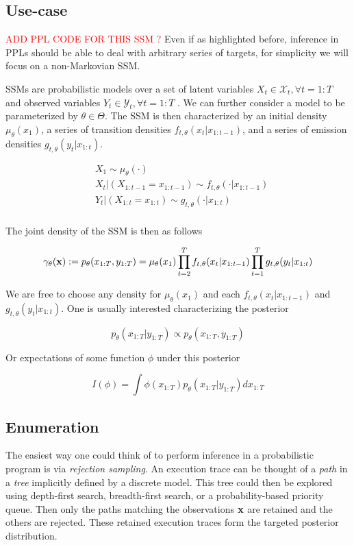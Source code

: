 \subsection{Use-case}
\textcolor{red}{ADD PPL CODE FOR THIS SSM ?}
Even if as highlighted before, inference in \gls{PPL}s should be able to deal with arbitrary series of targets, for simplicity we will focus on a non-Markovian \gls{SSM}.

\Gls{SSM}s are probabilistic models over a set of latent variables $X_t \in \mathcal{X}_t, \forall t = 1 : T$ and observed variables $Y_t \in \mathcal{Y}_t , \forall t = 1 : T$ . We can further consider a model to be parameterized by $\theta \in \Theta$. The \gls{SSM} is then characterized by an initial density $\mu_\theta(x_1)$, a series of transition densities $f_{t,\theta}(x_t|x_{1:t-1})$, and a series of emission densities $g_{t,\theta}(y_t|x_{1:t})$.

\begin{equation*}
\begin{aligned}
& X_1 \sim \mu_\theta(\cdot) \\
& X_t|(X_{1:t-1} = x_{1:t-1}) \sim f_{t,\theta}(\cdot|x_{1:t-1}) \\
& Y_t|(X_{1:t} = x_{1:t}) \sim g_{t,\theta}(\cdot|x_{1:t}) \\
\end{aligned}
\end{equation*}

The joint density of the \gls{SSM} is then as follows

$$ \gamma_\theta(\boldsymbol{\mathbf{x}}) := p_\theta(x_{1:T},y_{1:T}) = \mu_\theta(x_1) \prod_{t=2}^T f_{t,\theta}(x_t|x_{1:t-1}) \prod_{t=1}^T g_{t,\theta}(y_t|x_{1:t}) $$

We are free to choose any density for $\mu_\theta(x_1)$ and each $f_{t,\theta}(x_t|x_{1:t-1})$ and $g_{t,\theta}(y_t|x_{1:t})$. One is usually interested characterizing the posterior

$$ p_\theta(x_{1:T}|y_{1:T}) \propto p_\theta(x_{1:T},y_{1:T}) $$

Or expectations of some function $\phi$ under this posterior

$$ I(\phi) = \int \phi(x_{1:T}) p_\theta(x_{1:T}|y_{1:T}) dx_{1:T} $$

\subsection{Enumeration}
The easiest way one could think of to perform inference in a probabilistic program is via \textit{rejection sampling}. An execution trace can be thought of a \textit{path} in a \textit{tree} implicitly defined by a discrete model. This tree could then be explored using depth-first search, breadth-first search, or a probability-based priority queue. Then only the paths matching the observations $\boldsymbol{\mathbf{x}}$ are retained and the others are rejected. These retained execution traces form the targeted posterior distribution.

